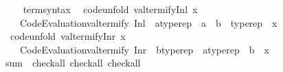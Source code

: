 \begin{isabellebody}
\isanewline
{}\isamarkupfalse%
%
\isadelimproof
\ %
\endisadelimproof
%
\isatagproof
\isacommand{{\isachardot}{\kern0pt}{\isachardot}{\kern0pt}}\isamarkupfalse%
%
\endisatagproof
{\isafoldproof}%
%
\isadelimproof
%
\endisadelimproof
\isanewline
\isanewline
{}\isamarkupfalse%
\isanewline
\isanewline
{}\isamarkupfalse%
\isanewline
\ \ \ term{\isacharunderscore}{\kern0pt}syntax\isanewline
{}\isanewline
\isanewline
{}\isamarkupfalse%
\isanewline
\ \ {\isacharbrackleft}{\kern0pt}code{\isacharunderscore}{\kern0pt}unfold{\isacharbrackright}{\kern0pt}{\isacharcolon}{\kern0pt}\ {\isachardoublequoteopen}valtermify{\isacharunderscore}{\kern0pt}Inl\ x\ {\isacharequal}{\kern0pt}\isanewline
\ \ \ \ Code{\isacharunderscore}{\kern0pt}Evaluation{\isachardot}{\kern0pt}valtermify\ {\isacharparenleft}{\kern0pt}Inl\ {\isacharcolon}{\kern0pt}{\isacharcolon}{\kern0pt}\ {\isacharprime}{\kern0pt}a{\isacharcolon}{\kern0pt}{\isacharcolon}{\kern0pt}typerep\ {\isasymRightarrow}\ {\isacharprime}{\kern0pt}a\ {\isacharplus}{\kern0pt}\ {\isacharprime}{\kern0pt}b\ {\isacharcolon}{\kern0pt}{\isacharcolon}{\kern0pt}\ typerep{\isacharparenright}{\kern0pt}\ {\isacharbraceleft}{\kern0pt}{\isasymcdot}{\isacharbraceright}{\kern0pt}\ x{\isachardoublequoteclose}\isanewline
\isanewline
{}\isamarkupfalse%
\isanewline
\ \ {\isacharbrackleft}{\kern0pt}code{\isacharunderscore}{\kern0pt}unfold{\isacharbrackright}{\kern0pt}{\isacharcolon}{\kern0pt}\ {\isachardoublequoteopen}valtermify{\isacharunderscore}{\kern0pt}Inr\ x\ {\isacharequal}{\kern0pt}\isanewline
\ \ \ \ Code{\isacharunderscore}{\kern0pt}Evaluation{\isachardot}{\kern0pt}valtermify\ {\isacharparenleft}{\kern0pt}Inr\ {\isacharcolon}{\kern0pt}{\isacharcolon}{\kern0pt}\ {\isacharprime}{\kern0pt}b{\isacharcolon}{\kern0pt}{\isacharcolon}{\kern0pt}typerep\ {\isasymRightarrow}\ {\isacharprime}{\kern0pt}a{\isacharcolon}{\kern0pt}{\isacharcolon}{\kern0pt}typerep\ {\isacharplus}{\kern0pt}\ {\isacharprime}{\kern0pt}b{\isacharparenright}{\kern0pt}\ {\isacharbraceleft}{\kern0pt}{\isasymcdot}{\isacharbraceright}{\kern0pt}\ x{\isachardoublequoteclose}\isanewline
\isanewline
{}\isamarkupfalse%
\isanewline
\isanewline
{}\isamarkupfalse%
\ sum\ {\isacharcolon}{\kern0pt}{\isacharcolon}{\kern0pt}\ {\isacharparenleft}{\kern0pt}check{\isacharunderscore}{\kern0pt}all{\isacharcomma}{\kern0pt}\ check{\isacharunderscore}{\kern0pt}all{\isacharparenright}{\kern0pt}\ check{\isacharunderscore}{\kern0pt}all\isanewline

\end{isabellebody}
